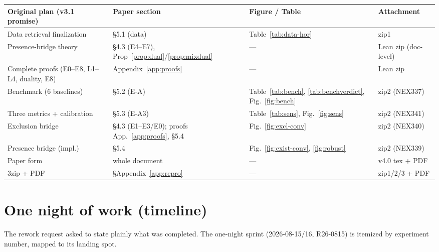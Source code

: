\documentclass[11pt]{article}
\begin{document}
\begin{center}
\begin{tabular}{p{3.4cm}p{3.2cm}p{3.2cm}p{2.2cm}}
\toprule
Original plan (v3.1 promise) & Paper section & Figure / Table & Attachment \\
\midrule
Data retrieval finalization & \S5.1 (data) & Table~\ref{tab:data-hor} & zip1 \\
Presence-bridge theory & \S4.3 (E4--E7), Prop~\ref{prop:dual}/\ref{prop:mixdual} & --- & Lean zip (doc-level) \\
Complete proofs (E0--E8, L1--L4, duality, E8) & Appendix~\ref{app:proofs} & --- & Lean zip \\
Benchmark (6 baselines) & \S5.2 (E-A) & Table~\ref{tab:bench}, \ref{tab:benchverdict}, Fig.~\ref{fig:bench} & zip2 (NEX337) \\
Three metrics + calibration & \S5.3 (E-A3) & Table~\ref{tab:sens}, Fig.~\ref{fig:sens} & zip2 (NEX341) \\
Exclusion bridge & \S4.3 (E1--E3/E0); proofs App.~\ref{app:proofs}, \S5.4 & Fig.~\ref{fig:excl-conv} & zip2 (NEX340) \\
Presence bridge (impl.) & \S5.4 & Fig.~\ref{fig:exist-conv}, \ref{fig:robust} & zip2 (NEX339) \\
Paper form & whole document & --- & v4.0 tex + PDF \\
3zip + PDF & \S Appendix~\ref{app:repro} & --- & zip1/2/3 + PDF \\
\bottomrule
\end{tabular}
\end{center}

\section{One night of work (timeline)}
\label{app:timeline}
The rework request asked to state plainly what was completed. The one-night
sprint (2026-08-15/16, R26-0815) is itemized by experiment number, mapped to
its landing spot.
\end{document}
